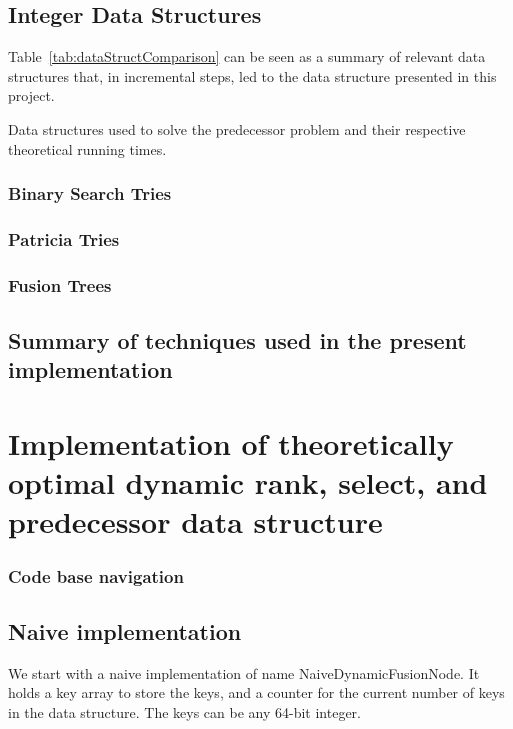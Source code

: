 \section{Integer Data Structures}

Table~\ref{tab:dataStructComparison} can be seen as a summary of relevant data structures that, in incremental steps, led to the data structure presented in this project.

\begin{table}[H]
\centering

\caption[Data structure comparison]{Data structures used to solve the predecessor problem and their respective theoretical running times.}
\label{tab:dataStructComparison}
\end{table}

\subsection{Binary Search Tries}

\subsection{Patricia Tries}

\subsection{Fusion Trees}

\section{Summary of techniques used in the present implementation}

\chapter{Implementation of theoretically optimal dynamic rank, select, and predecessor data structure}

\subsection{Code base navigation}

\section{Naive implementation}
We start with a naive implementation of name {\ttfamily NaiveDynamicFusionNode}. It holds a {\ttfamily key} array to store the keys, and a counter for the current number of keys in the data structure. The keys can be any 64-bit integer.

